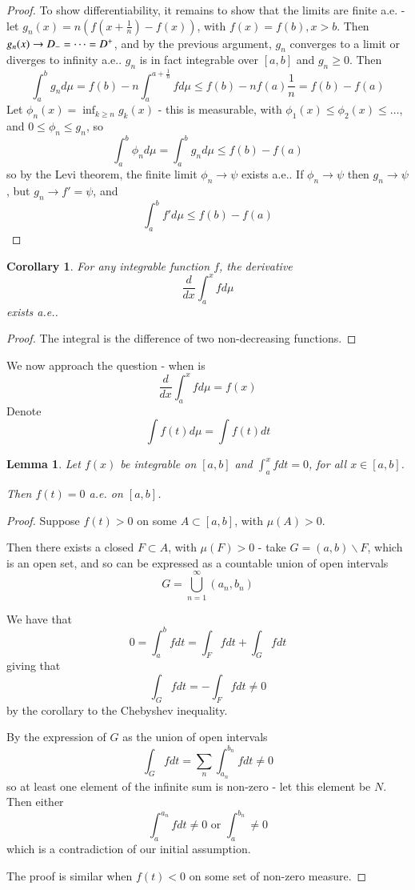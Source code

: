 \documentclass[11pt,a4paper]{report}
\newtheorem{lemma}[theorem]{Lemma}
\newtheorem{corollary}[theorem]{Corollary}
\theoremstyle{plain}
\theoremstyle{definition}
\theoremstyle{remark}
\newcommand{\Union}{\bigcup}
\newcommand{\contradiction}{\begin{flushright} \textreferencemark \end{flushright}}
\begin{document}
\begin{proof}
    To show differentiability, it remains to show that the limits are finite a.e. - let $g_n(x) = n(f(x + \frac{1}{n}) - f(x))$, with $f(x) = f(b), x > b$. Then $g_n(x) \rightarrow D_{-} = \dots = D^{+}$, and by the previous argument, $g_n$ converges to a limit or diverges to infinity a.e.. $g_n$ is in fact integrable over $[a, b]$ and $g_n \ge 0$. Then
    $$ \int_a^b g_n d\mu = f(b) - n\int_a^{a+\frac{1}{n}} f d\mu \le f(b) - nf(a)\frac{1}{n} = f(b) - f(a) $$
    Let $\phi_n(x) = \inf_{k \ge n} g_k(x)$ - this is measurable, with $\phi_1(x) \le \phi_2(x) \le \dots$, and $0 \le \phi_n \le g_n$, so
    $$ \int_a^b \phi_n d\mu = \int_a^b g_n d\mu \le f(b) - f(a) $$
    so by the Levi theorem, the finite limit $\phi_n \rightarrow \psi$ exists a.e.. If $\phi_n \rightarrow \psi$ then $g_n \rightarrow \psi$, but $g_n \rightarrow f' = \psi$, and
    $$ \int_a^b f' d\mu \le f(b) - f(a) $$
\end{proof}

\begin{corollary}
  For any integrable function $f$, the derivative 
  $$ \frac{d}{dx} \int_a^x f d\mu $$
    exists a.e..
\end{corollary}

\begin{proof}
  The integral is the difference of two non-decreasing functions.
\end{proof}

We now approach the question - when is
$$ \frac{d}{dx}\int_a^x fd\mu = f(x) $$
Denote 
$$ \int f(t) d\mu = \int f(t) dt $$

\begin{lemma}
  Let $f(x)$ be integrable on $[a, b]$ and $\int_a^x f dt = 0$, for all $x \in [a, b]$.

    Then $f(t) = 0$ a.e. on $[a, b]$.
\end{lemma}

\begin{proof}
    Suppose $f(t) > 0$ on some $A \subset [a, b]$, with $\mu(A) > 0$.

    Then there exists a closed $F \subset A$, with $\mu(F) > 0$ - take $G = (a, b) \backslash F$, which is an open set, and so can be expressed as a countable union of open intervals
    $$ G = \Union_{n=1}^\infty (a_n, b_n) $$

    We have that
    $$ 0 = \int_a^b f dt = \int_F f dt + \int_G f dt $$
    giving that
    $$ \int_G f dt = -\int_F f dt \ne 0 $$
    by the corollary to the Chebyshev inequality.

    By the expression of $G$ as the union of open intervals
    $$ \int_G f dt = \sum_n \int_{a_n}^{b_n} f dt \ne 0 $$
    so at least one element of the infinite sum is non-zero - let this element be $N$. Then either
    $$ \int_a^{a_n} f dt \ne 0 \text{ or } \int_a^{b_n} \ne 0 $$
    which is a contradiction of our initial assumption. \contradiction

    The proof is similar when $f(t) < 0$ on some set of non-zero measure.
\end{proof}
\end{document}
